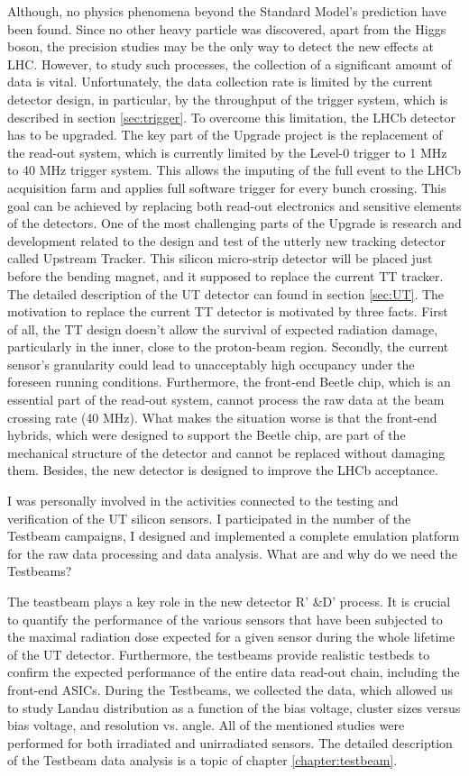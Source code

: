 Although, no physics phenomena beyond the Standard Model's prediction have been found. Since no other heavy particle was discovered, apart from the Higgs boson, the precision studies may be the only way to detect the new effects at LHC. However, to study such processes, the collection of a significant amount of data is vital. Unfortunately, the data collection rate is limited by the current detector design, in particular, by the throughput of the trigger system, which is described in section \ref{sec:trigger}. To overcome this limitation, the LHCb detector has to be upgraded. The key part of the Upgrade project is the replacement of the read-out system, which is currently limited by the Level-0 trigger to 1 MHz to 40 MHz trigger system. This allows the imputing of the full event to the LHCb acquisition farm and applies full software trigger for every bunch crossing. 
This goal can be achieved by replacing both read-out electronics and sensitive elements of the detectors. One of the most challenging parts of the Upgrade is research and development related to the design and test of the utterly new tracking detector called Upstream Tracker. This silicon micro-strip detector will be placed just before the bending magnet, and it supposed to replace the current TT tracker. The detailed description of the UT detector can found in section \ref{sec:UT}.  The motivation to replace the current TT detector is motivated by three facts. First of all, the TT design doesn't allow the survival of expected radiation damage, particularly in the inner, close to the proton-beam region. Secondly, the current sensor's granularity could lead to unacceptably high occupancy under the foreseen running conditions. Furthermore, the front-end Beetle chip, which is an essential part of the read-out system, cannot process the raw data at the beam crossing rate (40 MHz). What makes the situation worse is that the front-end hybrids, which were designed to support the Beetle chip, are part of the mechanical structure of the detector and cannot be replaced without damaging them. Besides, the new detector is designed to improve the LHCb acceptance.  

I was personally involved in the activities connected to the testing and verification of the UT silicon sensors. I participated in the number of the Testbeam campaigns, I designed and implemented a complete emulation platform for the raw data processing and data analysis. What are and why do we need the Testbeams? 

The teastbeam plays a key role in the new detector R' \&D' process. It is crucial to quantify the performance of the various sensors that have been subjected to the maximal radiation dose expected for a given sensor during the whole lifetime of the UT detector. Furthermore, the testbeams provide realistic testbeds to confirm the expected performance of the entire data read-out chain, including the front-end ASICs. During the Testbeams, we collected the data, which allowed us to study Landau distribution as a function of the bias voltage, cluster sizes versus bias voltage, and resolution vs. angle. All of the mentioned studies were performed for both irradiated and unirradiated sensors. The detailed description of the Testbeam data analysis is a topic of chapter \ref{chapter:testbeam}.

